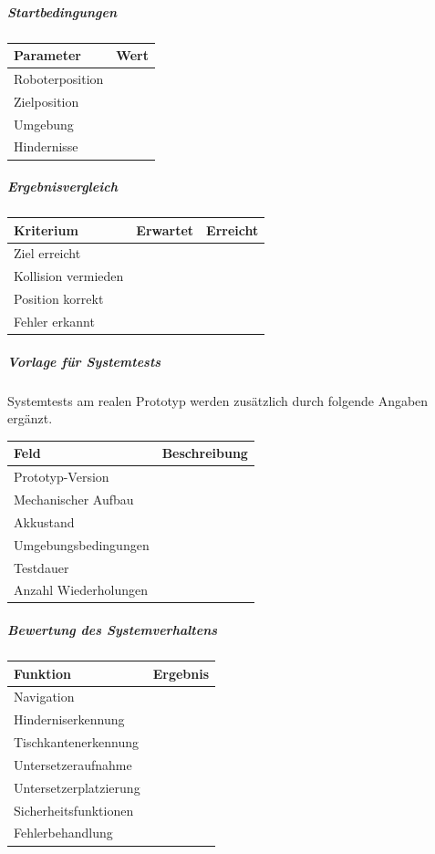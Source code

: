\subparagraph{Startbedingungen}\label{startbedingungen}

\begin{longtable}[]{@{}ll@{}}
\toprule\noalign{}
Parameter & Wert \\
\midrule\noalign{}
\endhead
\bottomrule\noalign{}
\endlastfoot
Roboterposition & \\
Zielposition & \\
Umgebung & \\
Hindernisse & \\
\end{longtable}

\subparagraph{Ergebnisvergleich}\label{ergebnisvergleich}

\begin{longtable}[]{@{}lll@{}}
\toprule\noalign{}
Kriterium & Erwartet & Erreicht \\
\midrule\noalign{}
\endhead
\bottomrule\noalign{}
\endlastfoot
Ziel erreicht & & \\
Kollision vermieden & & \\
Position korrekt & & \\
Fehler erkannt & & \\
\end{longtable}

\subparagraph{Vorlage für Systemtests}\label{vorlage-fuxfcr-systemtests}

Systemtests am realen Prototyp werden zusätzlich durch folgende Angaben
ergänzt.

\begin{longtable}[]{@{}ll@{}}
\toprule\noalign{}
Feld & Beschreibung \\
\midrule\noalign{}
\endhead
\bottomrule\noalign{}
\endlastfoot
Prototyp-Version & \\
Mechanischer Aufbau & \\
Akkustand & \\
Umgebungsbedingungen & \\
Testdauer & \\
Anzahl Wiederholungen & \\
\end{longtable}

\subparagraph{Bewertung des
Systemverhaltens}\label{bewertung-des-systemverhaltens}

\begin{longtable}[]{@{}ll@{}}
\toprule\noalign{}
Funktion & Ergebnis \\
\midrule\noalign{}
\endhead
\bottomrule\noalign{}
\endlastfoot
Navigation & \\
Hinderniserkennung & \\
Tischkantenerkennung & \\
Untersetzeraufnahme & \\
Untersetzerplatzierung & \\
Sicherheitsfunktionen & \\
Fehlerbehandlung & \\
\end{longtable}

